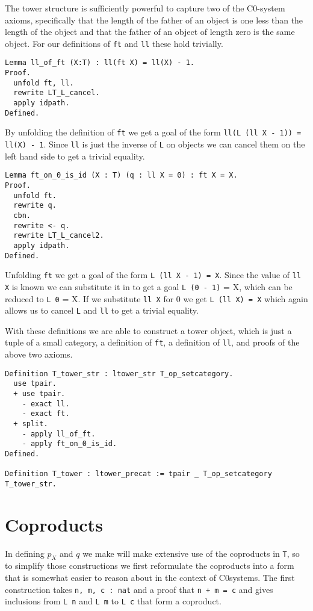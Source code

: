 The tower structure is sufficiently powerful to capture two of the C0-system
axioms, specifically that the length of the father of an object is one less than
the length of the object and that the father of an object of length zero is the
same object. For our definitions of \lstinline|ft| and \lstinline|ll| these hold
trivially.
\begin{lstlisting}
Lemma ll_of_ft (X:T) : ll(ft X) = ll(X) - 1.
Proof.
  unfold ft, ll.
  rewrite LT_L_cancel.
  apply idpath.
Defined.
\end{lstlisting}

By unfolding the definition of \lstinline|ft| we get a goal of the form
\lstinline|ll(L (ll X - 1)) = ll(X) - 1|. Since \lstinline|ll| is just the
inverse of \lstinline|L| on objects we can cancel them on the left hand side to
get a trivial equality. 

\begin{lstlisting}
Lemma ft_on_0_is_id (X : T) (q : ll X = 0) : ft X = X.
Proof.
  unfold ft.
  rewrite q.
  cbn.
  rewrite <- q.
  rewrite LT_L_cancel2.
  apply idpath.
Defined.
\end{lstlisting}

Unfolding \lstinline|ft| we get a goal of the form \lstinline|L (ll X - 1) = X|.
Since the value of \lstinline|ll X| is known we can substitute it in to get a
goal \lstinline|L (0 - 1)| = X, which can be reduced to \lstinline|L 0| = X. If
we substitute \lstinline|ll X| for 0 we get \lstinline|L (ll X) = X| which again
allows us to cancel \lstinline|L| and \lstinline|ll| to get a trivial equality.

With these definitions we are able to construct a tower object, which is just a
tuple of a small category, a definition of \lstinline|ft|, a definition of \lstinline|ll|,
and proofs of the above two axioms.
\begin{lstlisting}
Definition T_tower_str : ltower_str T_op_setcategory.
  use tpair.
  + use tpair.
    - exact ll.
    - exact ft.
  + split.
    - apply ll_of_ft.
    - apply ft_on_0_is_id.
Defined.

Definition T_tower : ltower_precat := tpair _ T_op_setcategory T_tower_str.
\end{lstlisting}

\section{Coproducts}
In defining $p_X$ and $q$ we make will make extensive use of the coproducts in
\lstinline|T|, so to simplify those constructions we first reformulate the
coproducts into a form that is somewhat easier to reason about in the context of
C0systems. The first construction takes \lstinline|n, m, c : nat| and a proof
that \lstinline|n + m = c| and gives inclusions from \lstinline|L n| and
\lstinline|L m| to \lstinline|L c| that form a coproduct.

